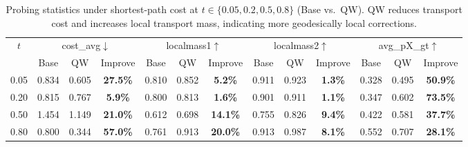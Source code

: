 \documentclass[journal,twoside,web]{ieeecolor}
\begin{document}
\begin{table}[t]
\centering
\caption{Probing statistics under shortest-path cost at $t\in\{0.05,0.2,0.5,0.8\}$ (Base vs.\ QW). QW reduces transport cost and increases local transport mass, indicating more geodesically local corrections.}
\renewcommand\arraystretch{1.15}
\begin{tabular*}{\textwidth}{@{\extracolsep{\fill}}c|ccc|ccc|ccc|ccc@{\extracolsep{\fill}}}
\toprule
\multirow{2}{*}{$t$} &
\multicolumn{3}{c|}{cost\_avg$\downarrow$} &
\multicolumn{3}{c|}{localmass1$\uparrow$} &
\multicolumn{3}{c|}{localmass2$\uparrow$} &
\multicolumn{3}{c}{avg\_pX\_gt$\uparrow$} \\
\cmidrule(lr){2-4}\cmidrule(lr){5-7}\cmidrule(lr){8-10}\cmidrule(lr){11-13}
& Base & QW & Improve & Base & QW & Improve & Base & QW & Improve & Base & QW & Improve \\
\midrule
0.05 & 0.834 & 0.605 & \textbf{27.5\%} & 0.810 & 0.852 & \textbf{5.2\%} & 0.911 & 0.923 & \textbf{1.3\%} & 0.328 & 0.495 & \textbf{50.9\%} \\
0.20 & 0.815 & 0.767 & \textbf{5.9\%}  & 0.800 & 0.813 & \textbf{1.6\%} & 0.901 & 0.911 & \textbf{1.1\%} & 0.347 & 0.602 & \textbf{73.5\%} \\
0.50 & 1.454 & 1.149 & \textbf{21.0\%} & 0.612 & 0.698 & \textbf{14.1\%} & 0.755 & 0.826 & \textbf{9.4\%} & 0.422 & 0.581 & \textbf{37.7\%} \\
0.80 & 0.800 & 0.344 & \textbf{57.0\%} & 0.761 & 0.913 & \textbf{20.0\%} & 0.913 & 0.987 & \textbf{8.1\%} & 0.552 & 0.707 & \textbf{28.1\%} \\
\hline
\end{tabular*}
\label{tab:probing_short}
\end{table}
\end{document}
